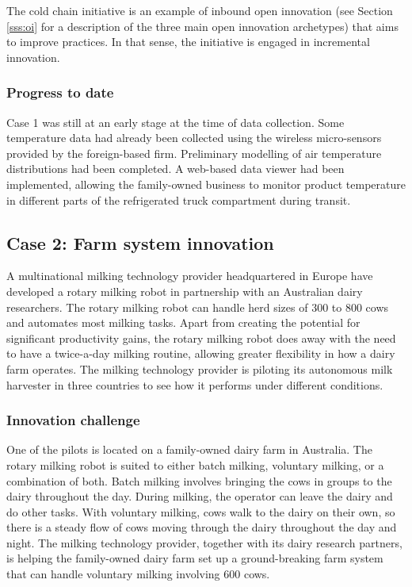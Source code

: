 The cold chain initiative is an example of inbound open innovation (see Section \ref{sss:oi} for a description of the three main open innovation archetypes) that aims to improve practices. In that sense, the initiative is engaged in incremental innovation. 

\subsubsection{Progress to date}

Case 1 was still at an early stage at the time of data collection. Some temperature data had already been collected using the wireless micro-sensors provided by the foreign-based firm. Preliminary modelling of air temperature distributions had been completed. A web-based data viewer had been implemented, allowing the family-owned business to monitor product temperature in different parts of the refrigerated truck compartment during transit. \medskip

\subsection{Case 2: Farm system innovation}

A multinational milking technology provider headquartered in Europe have developed a rotary milking robot in partnership with an Australian dairy researchers. The rotary milking robot can handle herd sizes of 300 to 800 cows and automates most milking tasks. Apart from creating the potential for significant productivity gains, the rotary milking robot does away with the need to have a twice-a-day milking routine, allowing greater flexibility in how a dairy farm operates. The milking technology provider is piloting its autonomous milk harvester in three countries to see how it performs under different conditions. 

\subsubsection{Innovation challenge}

One of the pilots is located on a family-owned dairy farm in Australia. The rotary milking robot is suited to either batch milking, voluntary milking, or a combination of both. Batch milking involves bringing the cows in groups to the dairy throughout the day. During milking, the operator can leave the dairy and do other tasks. With voluntary milking, cows walk to the dairy on their own, so there is a steady flow of cows moving through the dairy throughout the day and night. The milking technology provider, together with its dairy research partners, is helping the family-owned dairy farm set up a ground-breaking farm system that can handle voluntary milking involving 600 cows. \medskip

